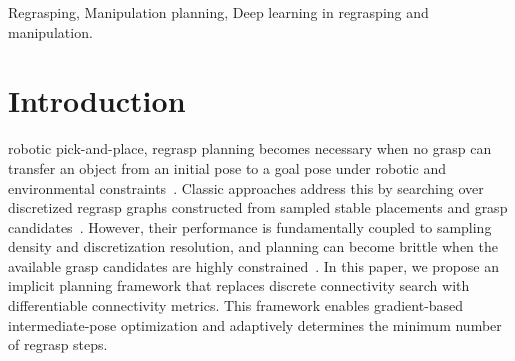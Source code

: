 \documentclass[journal, twoside]{IEEEtran}
\begin{document}
\begin{abstract}
Regrasp planning is often required when one pick-and-place cannot transfer an object from an initial pose to a goal pose while maintaining grasp feasibility. The main challenge is to reason about shared-grasp connectivity across intermediate poses, where discrete search becomes brittle under sparse grasp candidates. We propose an implicit multi-step regrasp planning framework based on differentiable pose sequence connectivity metrics. We model grasp feasibility under an object pose using an Energy-Based Model (EBM) and leverage energy additivity to construct a continuous energy landscape that measures pose-pair connectivity, enabling gradient-based optimization of intermediate object poses. An adaptive iterative deepening strategy is introduced to determine the minimum number of intermediate steps automatically. Experiments show that the proposed cost formulation provides smooth and informative gradients, improving planning robustness over other alternatives. They also demonstrate generalization to unseen grasp poses and cross-end-effector transfer, where a model trained with suction constraints can guide parallel gripper grasp manipulation. The multi-step planning results further highlight the effectiveness of adaptive deepening and minimum-step search.
\end{abstract}

\begin{IEEEkeywords}
Regrasping, Manipulation planning, Deep learning in regrasping and manipulation.
\end{IEEEkeywords}

\section{Introduction}
\label{sec_introduction}

 robotic pick-and-place, regrasp planning becomes necessary when no grasp can transfer an object from an initial pose to a goal pose under robotic and environmental constraints~\cite{tournassoud1987regrasping}. Classic approaches address this by searching over discretized regrasp graphs constructed from sampled stable placements and grasp candidates~\cite{cho2003complete}\cite{simeon2004manipulation}. However, their performance is fundamentally coupled to sampling density and discretization resolution, and planning can become brittle when the available grasp candidates are highly constrained~\cite{9865999}\cite{10629240}\cite{raessa2021planning}. In this paper, we propose an implicit planning framework that replaces discrete connectivity search with differentiable connectivity metrics. This framework enables gradient-based intermediate-pose optimization and adaptively determines the minimum number of regrasp steps.
\end{document}
